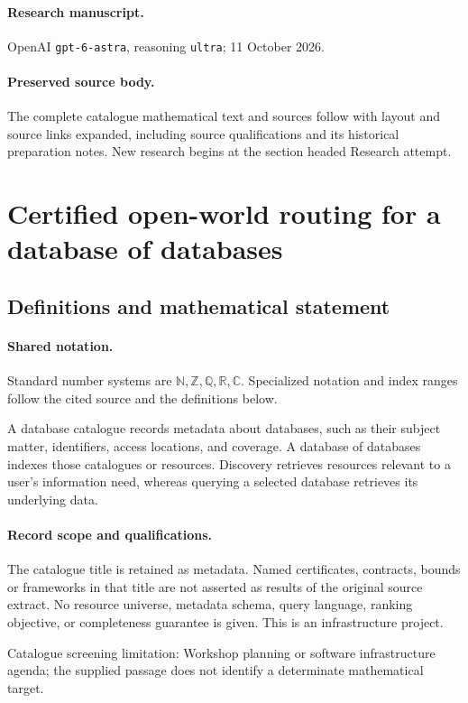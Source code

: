 \documentclass[11pt]{article}
\begin{document}
\paragraph{Research manuscript.} OpenAI \texttt{gpt-6-astra}, reasoning \texttt{ultra}; 11 October 2026.
\paragraph{Preserved source body.} The complete catalogue mathematical text and sources follow with layout and source links expanded, including source qualifications and its historical preparation notes. New research begins at the section headed Research attempt.

\section{Certified open-world routing for a database of databases}\label{statement}

\subsection{Definitions and mathematical statement}

\paragraph{Shared notation.}Standard number systems are $\mathbb N,\mathbb Z,\mathbb Q,\mathbb R,\mathbb C$. Specialized notation and index ranges follow the cited source and the definitions below.


A database catalogue records metadata about databases, such as their subject matter, identifiers, access locations, and coverage. A database of databases indexes those catalogues or resources. Discovery retrieves resources relevant to a user's information need, whereas querying a selected database retrieves its underlying data.
\paragraph{Record scope and qualifications.}
The catalogue title is retained as metadata. Named certificates, contracts, bounds or frameworks in that title are not asserted as results of the original source extract.
No resource universe, metadata schema, query language, ranking objective, or completeness guarantee is given. This is an infrastructure project.

Catalogue screening limitation: Workshop planning or software infrastructure agenda; the supplied passage does not identify a determinate mathematical target.
\end{document}
